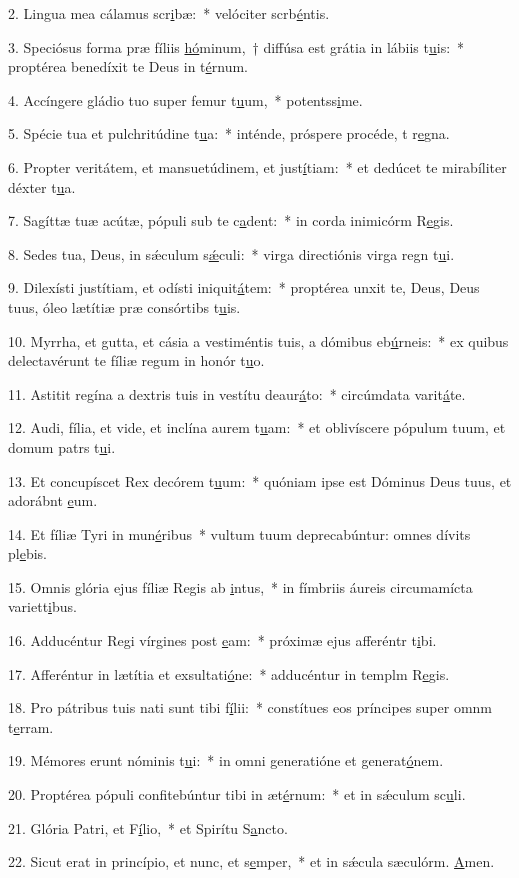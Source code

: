 2. Lingua mea cálamus scr\uline{i}bæ:~* velóciter scrb\uline{é}ntis.\par 
3. Speciósus forma præ fíliis \uline{hó}minum,~† diffúsa est grátia in lábiis t\uline{u}is:~* proptérea benedíxit te Deus in t\uline{é}rnum.\par 
4. Accíngere gládio tuo super femur t\uline{u}um,~* potentss\uline{i}me.\par 
5. Spécie tua et pulchritúdine t\uline{u}a:~* inténde, próspere procéde, t r\uline{e}gna.\par 
6. Propter veritátem, et mansuetúdinem, et just\uline{í}tiam:~* et dedúcet te mirabíliter déxter t\uline{u}a.\par 
7. Sagíttæ tuæ acútæ, pópuli sub te c\uline{a}dent:~* in corda inimicórm R\uline{e}gis.\par 
8. Sedes tua, Deus, in sǽculum s\uline{ǽ}culi:~* virga directiónis virga regn t\uline{u}i.\par 
9. Dilexísti justítiam, et odísti iniquit\uline{á}tem:~* proptérea unxit te, Deus, Deus tuus, óleo lætítiæ præ consórtibs t\uline{u}is.\par 
10. Myrrha, et gutta, et cásia a vestiméntis tuis, a dómibus eb\uline{ú}rneis:~* ex quibus delectavérunt te fíliæ regum in honór t\uline{u}o.\par 
11. Astitit regína a dextris tuis in vestítu deaur\uline{á}to:~* circúmdata varit\uline{á}te.\par 
12. Audi, fília, et vide, et inclína aurem t\uline{u}am:~* et oblivíscere pópulum tuum, et domum patrs t\uline{u}i.\par 
13. Et concupíscet Rex decórem t\uline{u}um:~* quóniam ipse est Dóminus Deus tuus, et adorábnt \uline{e}um.\par 
14. Et fíliæ Tyri in mun\uline{é}ribus~* vultum tuum deprecabúntur: omnes dívits pl\uline{e}bis.\par 
15. Omnis glória ejus fíliæ Regis ab \uline{i}ntus,~* in fímbriis áureis circumamícta variett\uline{i}bus.\par 
16. Adducéntur Regi vírgines post \uline{e}am:~* próximæ ejus afferéntr t\uline{i}bi.\par 
17. Afferéntur in lætítia et exsultati\uline{ó}ne:~* adducéntur in templm R\uline{e}gis.\par 
18. Pro pátribus tuis nati sunt tibi f\uline{í}lii:~* constítues eos príncipes super omnm t\uline{e}rram.\par 
19. Mémores erunt nóminis t\uline{u}i:~* in omni generatióne et generat\uline{ó}nem.\par 
20. Proptérea pópuli confitebúntur tibi in æt\uline{é}rnum:~* et in sǽculum sc\uline{u}li.\par 
21. Glória Patri, et F\uline{í}lio,~* et Spirítu S\uline{a}ncto.\par 
22. Sicut erat in princípio, et nunc, et s\uline{e}mper,~* et in sǽcula sæculórm. \uline{A}men.\par 
